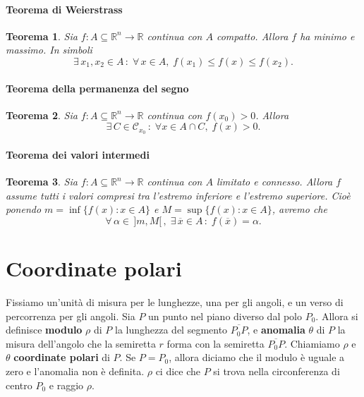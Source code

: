 \documentclass{article}
\theoremstyle{plain}
\newtheorem{thm}{Teorema}[section]
\theoremstyle{definition}
\theoremstyle{remark}
\begin{document}
\paragraph{Teorema di Weierstrass}
\begin{bxthm}
\begin{thm}
    Sia $f:A\subseteq\mathbb{R}^n\to\mathbb{R}$ continua con $A$ compatto.
    Allora $f$ ha minimo e massimo. In simboli 
    \[\exists\,x_1,x_2\in A\,:\;\forall\, x\in A,\;f(x_1)\leq f(x)\leq f(x_2).\]
\end{thm}
\end{bxthm}

\vspace{10pt}

\paragraph{Teorema della permanenza del segno}
\begin{bxthm}
\begin{thm}
    Sia $f:A\subseteq\mathbb{R}^n\to\mathbb{R}$ continua con $f(x_0)>0$. Allora 
    \[\exists\,C\in\mathcal{C}_{x_0}\,:\;\forall x\in A\cap C,\; f(x)>0.\]
\end{thm}
\end{bxthm}

\vspace{10pt}

\paragraph{Teorema dei valori intermedi}
\begin{bxthm}
\begin{thm}
    Sia $f:A\subseteq\mathbb{R}^n\to\mathbb{R}$ continua con $A$ limitato e connesso.
    Allora $f$ assume tutti i valori compresi tra l'estremo inferiore e l'estremo superiore.
    Cioè ponendo $m=\inf\{f(x):x\in A\}$ e $M=\sup\{f(x):x\in A\}$, avremo che 
    \[\forall\,\alpha\in\,]m,M[\,,\;\exists\,\overline{x}\in A\,:\;f(\overline{x})=\alpha.\]
\end{thm}
\end{bxthm}

\vspace{10pt}

\section{Coordinate polari}

\vspace{10pt}
Fissiamo un'unità di misura per le lunghezze, una per gli angoli, e un verso di percorrenza per gli angoli.
Sia $P$ un punto nel piano diverso dal polo $P_0$.
Allora si definisce \textbf{modulo} $\rho$ di $P$ la lunghezza del segmento $\overline{P_0P}$, e 
\textbf{anomalia} $\theta$ di $P$ la misura dell'angolo che la semiretta $r$ forma con la semiretta $\overline{P_0P}$.
Chiamiamo $\rho$ e $\theta$ \textbf{coordinate polari} di $P$.
Se $P=P_0$, allora diciamo che il modulo è uguale a zero e l'anomalia non è definita.
$\rho$ ci dice che $P$ si trova nella circonferenza di centro $P_0$ e raggio $\rho$.
\end{document}
